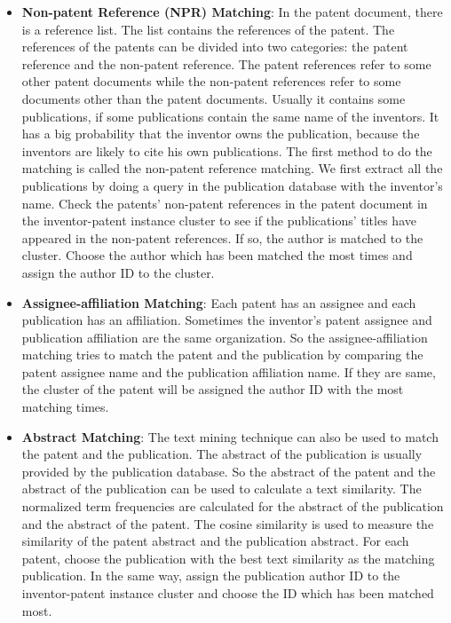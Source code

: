 \begin{itemize}

\item \textbf{Non-patent Reference (NPR) Matching}:
In the patent document, there is a reference list. The list contains the references of the patent. The references of the patents can be divided into two categories: the patent reference and the non-patent reference. The patent references refer to some other patent documents while the non-patent references refer to some documents other than the patent documents. Usually it contains some publications, if some publications contain the same name of the inventors. It has a big probability that the inventor owns the publication, because the inventors are likely to cite his own publications. The first method to do the matching is called the non-patent reference matching. We first extract all the publications by doing a query in the publication database with the inventor's name. Check the patents' non-patent references in the patent document in the inventor-patent instance cluster to see if the publications' titles have appeared in the non-patent references. If so, the author is matched to the cluster. Choose the author which has been matched the most times and assign the author ID to the cluster.

\item \textbf{Assignee-affiliation Matching}:
Each patent has an assignee and each publication has an affiliation. Sometimes the inventor's patent assignee and publication affiliation are the same organization. So the assignee-affiliation matching tries to match the patent and the publication by comparing the patent assignee name and the publication affiliation name. If they are  same, the cluster of the patent will be assigned the author ID with the most matching times.

\item \textbf{Abstract Matching}:
The text mining technique can also be used to match the patent and the publication. The abstract of the publication is usually provided by the publication database. So the abstract of the patent and the abstract of the publication can be used to calculate a text similarity. The normalized term frequencies are calculated for the abstract of the publication and the abstract of the patent. The cosine similarity is used to measure the similarity of the patent abstract and the publication abstract. For each patent, choose the publication with the best text similarity as the matching publication. In the same way, assign the publication author ID to the inventor-patent instance cluster and choose the ID which has been matched most. 
 
\end{itemize}

